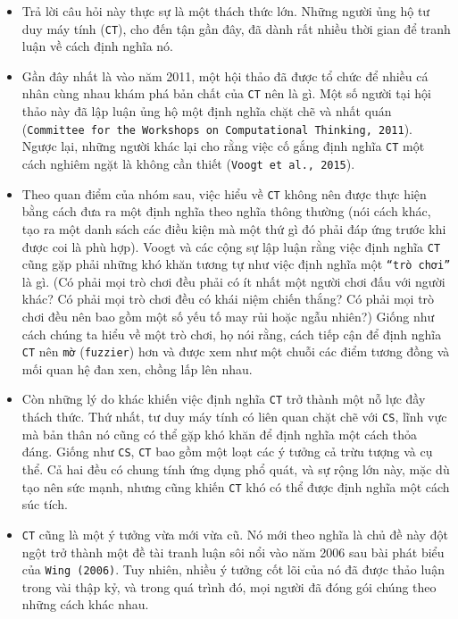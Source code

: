 \begin{itemize}
    \item Trả lời câu hỏi này thực sự là một thách thức lớn. Những người ủng hộ tư duy máy tính (\texttt{CT}), cho đến tận gần đây, đã dành rất nhiều thời gian để tranh luận về cách định nghĩa nó.

    \item Gần đây nhất là vào năm 2011, một hội thảo đã được tổ chức để nhiều cá nhân cùng nhau khám phá bản chất của \texttt{CT} nên là gì. Một số người tại hội thảo này đã lập luận ủng hộ một định nghĩa chặt chẽ và nhất quán (\texttt{Committee for the Workshops on Computational Thinking, 2011}). Ngược lại, những người khác lại cho rằng việc cố gắng định nghĩa \texttt{CT} một cách nghiêm ngặt là không cần thiết (\texttt{Voogt et al., 2015}).

    \item Theo quan điểm của nhóm sau, việc hiểu về \texttt{CT} không nên được thực hiện bằng cách đưa ra một định nghĩa theo nghĩa thông thường (nói cách khác, tạo ra một danh sách các điều kiện mà một thứ gì đó phải đáp ứng trước khi được coi là phù hợp). Voogt và các cộng sự lập luận rằng việc định nghĩa \texttt{CT} cũng gặp phải những khó khăn tương tự như việc định nghĩa một \texttt{``trò chơi''} là gì. (Có phải mọi trò chơi đều phải có ít nhất một người chơi đấu với người khác? Có phải mọi trò chơi đều có khái niệm chiến thắng? Có phải mọi trò chơi đều nên bao gồm một số yếu tố may rủi hoặc ngẫu nhiên?) Giống như cách chúng ta hiểu về một trò chơi, họ nói rằng, cách tiếp cận để định nghĩa \texttt{CT} nên \verb|mờ| (\verb|fuzzier|) hơn và được xem như một chuỗi các điểm tương đồng và mối quan hệ đan xen, chồng lấp lên nhau.

    \item Còn những lý do khác khiến việc định nghĩa \texttt{CT} trở thành một nỗ lực đầy thách thức. Thứ nhất, tư duy máy tính có liên quan chặt chẽ với \texttt{CS}, lĩnh vực mà bản thân nó cũng có thể gặp khó khăn để định nghĩa một cách thỏa đáng. Giống như \texttt{CS}, \texttt{CT} bao gồm một loạt các ý tưởng cả trừu tượng và cụ thể. Cả hai đều có chung tính ứng dụng phổ quát, và sự rộng lớn này, mặc dù tạo nên sức mạnh, nhưng cũng khiến \texttt{CT} khó có thể được định nghĩa một cách súc tích.

    \item \texttt{CT} cũng là một ý tưởng vừa mới vừa cũ. Nó mới theo nghĩa là chủ đề này đột ngột trở thành một đề tài tranh luận sôi nổi vào năm 2006 sau bài phát biểu của \texttt{Wing (2006)}. Tuy nhiên, nhiều ý tưởng cốt lõi của nó đã được thảo luận trong vài thập kỷ, và trong quá trình đó, mọi người đã đóng gói chúng theo những cách khác nhau.


\end{itemize}

